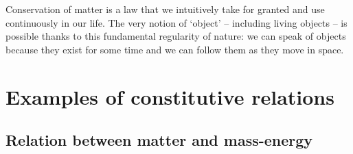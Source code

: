\documentclass[a4paper,12pt,%
onecolumn,oneside,titlepage,%
british%
]{memoir}
\newcommand*{\defd}{\coloneqq}
\renewcommand*{\|}[1][]{\nonscript\:#1\vert\nonscript\:\mathopen{}}
\newcommand*{\yN}{N}
\newcommand*{\yJ}{J}
\newcommand*{\masse}{mass-energy}
\begin{document}
Conservation of matter is a law that we intuitively take for granted and use continuously in our life. The very notion of \enquote*{object} -- including living objects -- is possible thanks to this fundamental regularity of nature: we can speak of objects because they exist for some time and we can follow them as they move in space. %


\section{Examples of constitutive relations}
\label{sec:matter_constitutive}

\subsection{Relation between matter and \masse}
\label{sec:const_matter_mass}
\end{document}
